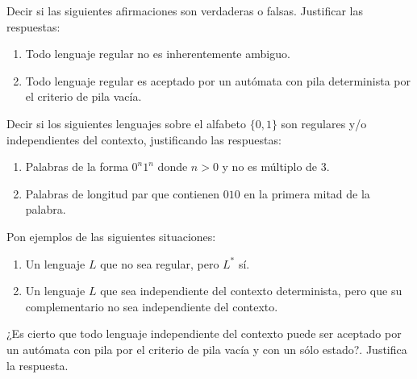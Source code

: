 \documentclass[12pt]{article}
\begin{document}
\begin{ejercicio}[1.25 puntos]
    Decir si las siguientes afirmaciones son verdaderas o falsas. Justificar las respuestas:
    \begin{enumerate}
        \item Todo lenguaje regular no es inherentemente ambiguo.
        \item Todo lenguaje regular es aceptado por un autómata con pila determinista por el criterio de pila vacía.
    \end{enumerate}
\end{ejercicio}

\begin{ejercicio}[1.25 puntos]
    Decir si los siguientes lenguajes sobre el alfabeto $\{0, 1\}$ son regulares y/o independientes del contexto, justificando las respuestas:
    \begin{enumerate}
        \item Palabras de la forma $0^n1^n$ donde $n > 0$ y no es múltiplo de $3$.
        \item Palabras de longitud par que contienen $010$ en la primera mitad de la palabra.
    \end{enumerate}
\end{ejercicio}

\begin{ejercicio}[1.25 puntos]
    Pon ejemplos de las siguientes situaciones:
    \begin{enumerate}
        \item Un lenguaje $L$ que no sea regular, pero $L^*$ sí.
        \item Un lenguaje $L$ que sea independiente del contexto determinista, pero que su complementario no sea independiente del contexto.
    \end{enumerate}
\end{ejercicio}

\begin{ejercicio}[1.25 puntos]
    ¿Es cierto que todo lenguaje independiente del contexto puede ser aceptado por un autómata con pila por el criterio de pila vacía y con un sólo estado?. Justifica la respuesta.
\end{ejercicio}
\end{document}
